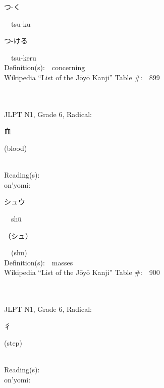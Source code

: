 \begin{multicols}{2}
{\hspace*{2em}}{\begin{CJK}{UTF8}{min} つ-く \end{CJK}}\ \ tsu-ku\ \ \\
{\hspace*{2em}}{\begin{CJK}{UTF8}{min} つ-ける \end{CJK}}\ \ tsu-keru\ \ \\
Definition(s):\ \ concerning \\
Wikipedia ``List of the J\=oy\=o Kanji'' Table \#:\ \ 899 \\
\ \ \\
{\fontsize{34pt}{40pt}  }\ \ \\  %
{JLPT N1, Grade 6, Radical:\ \ {\begin{CJK}{UTF8}{min} 血 \end{CJK}} (blood) } \\
Reading(s):\ \ \\
{\hspace*{1em}}on'yomi:\ \ \\
{\hspace*{2em}}{\begin{CJK}{UTF8}{min} シュウ \end{CJK}}\ \ sh\=u\ \ \\
{\hspace*{2em}}{\begin{CJK}{UTF8}{min} （シュ） \end{CJK}}\ \ (shu)\ \ \\
Definition(s):\ \ masses \\
Wikipedia ``List of the J\=oy\=o Kanji'' Table \#:\ \ 900 \\
\ \ \\
{\fontsize{34pt}{40pt}  }\ \ \\  %
{JLPT N1, Grade 6, Radical:\ \ {\begin{CJK}{UTF8}{min} 彳 \end{CJK}} (step) } \\
Reading(s):\ \ \\
{\hspace*{1em}}on'yomi:\ \ \\

\end{multicols}
